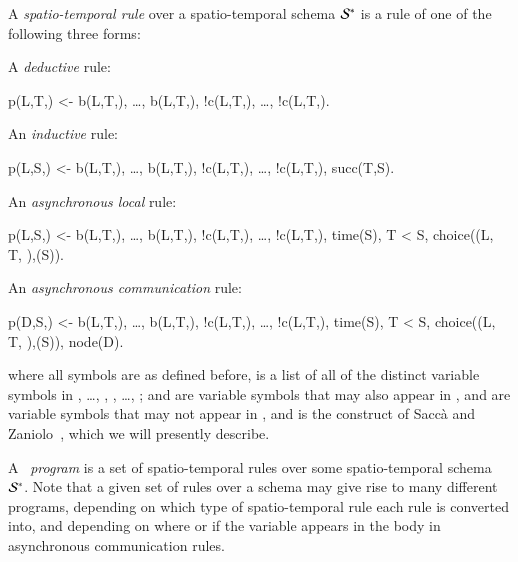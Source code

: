 A {\em spatio-temporal rule} over a spatio-temporal schema $\mathcal{S}^*$ is a rule of one of the following three forms:


A {\em deductive} rule:

\begin{Dedalus}
p(L,T,) <- b(L,T,), \ldots, b(L,T,),
!c(L,T,), \ldots, !c(L,T,).
\end{Dedalus}

An {\em inductive} rule:

\begin{Dedalus}
p(L,S,) <- b(L,T,), \ldots, b(L,T,),
!c(L,T,), \ldots, !c(L,T,), succ(T,S).
\end{Dedalus}

An {\em asynchronous local} rule:

\begin{Dedalus}
p(L,S,) <- b(L,T,), \ldots, b(L,T,),
!c(L,T,), \ldots, !c(L,T,), time(S),
T < S, choice((L, T, ),(S)).
\end{Dedalus}

An {\em asynchronous communication} rule:

\begin{Dedalus}
p(D,S,) <- b(L,T,), \ldots, b(L,T,),
!c(L,T,), \ldots, !c(L,T,), time(S),
T < S, choice((L, T, ),(S)), node(D).
\end{Dedalus}


where all symbols are as defined before,  is a list of all of the distinct variable symbols in , \ldots, , , \ldots, ;  and  are variable symbols that may also appear in ,  and  are variable symbols that may not appear in , and  is the construct of Sacc\`{a} and Zaniolo~\cite{sacca-zaniolo}, which we will presently describe.

A \lang\ {\em program} is a set of spatio-temporal rules over some spatio-temporal schema $\mathcal{S}^*$.  Note that a given set of rules over a schema may give rise to many different \lang programs, depending on which type of spatio-temporal rule each rule is converted into, and depending on where or if the variable  appears in the body in asynchronous communication rules. 

